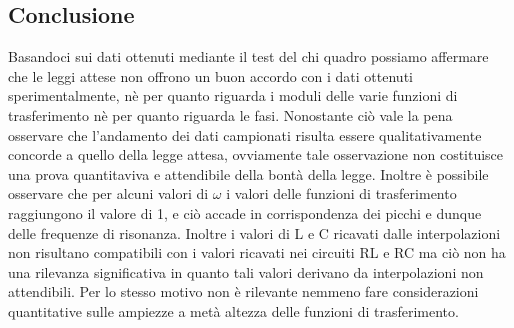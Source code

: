 \documentclass[a4paper]{article}
\begin{document}
\subsection{Conclusione}
Basandoci sui dati ottenuti mediante il test del chi quadro possiamo affermare che le leggi attese non offrono un buon accordo con i dati ottenuti sperimentalmente, nè per quanto riguarda i moduli delle varie funzioni di trasferimento nè per quanto riguarda le fasi. Nonostante ciò vale la pena osservare che l'andamento dei dati campionati risulta essere qualitativamente concorde a quello della legge attesa, ovviamente tale osservazione non costituisce una prova quantitaviva e attendibile della bontà della legge. Inoltre è possibile osservare che per alcuni valori di $\omega$ i valori delle funzioni di trasferimento raggiungono il valore di 1, e ciò accade in corrispondenza dei picchi e dunque delle frequenze di risonanza. Inoltre i valori di L e C ricavati dalle interpolazioni non risultano compatibili con i valori ricavati nei circuiti RL e RC ma ciò non ha una rilevanza significativa in quanto tali valori derivano da interpolazioni non attendibili. Per lo stesso motivo non è rilevante nemmeno fare considerazioni quantitative sulle ampiezze a metà altezza delle funzioni di trasferimento.
\end{document}
